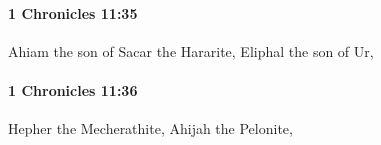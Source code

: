		\paragraph{1 Chronicles 11:35} %
			\label{1CHRONICLES-11-35}

			Ahiam the son of Sacar the Hararite, Eliphal the son of Ur,


		\paragraph{1 Chronicles 11:36} %
			\label{1CHRONICLES-11-36}

			Hepher the Mecherathite, Ahijah the Pelonite,


